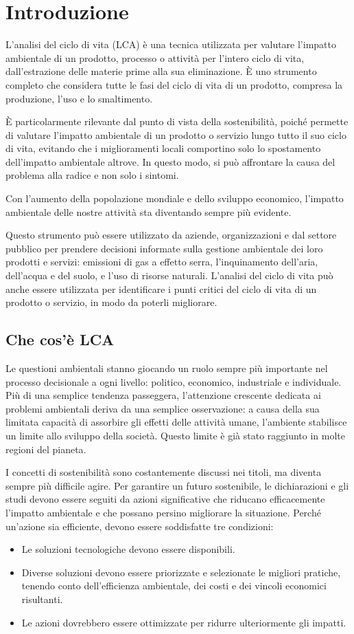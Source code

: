 \section{Introduzione}
L'analisi del ciclo di vita (LCA) è una tecnica utilizzata per valutare l'impatto ambientale di un prodotto, processo o attività per l'intero ciclo di vita, dall'estrazione delle materie prime alla sua eliminazione. È uno strumento completo che considera tutte le fasi del ciclo di vita di un prodotto, compresa la produzione, l'uso e lo smaltimento.

È particolarmente rilevante dal punto di vista della sostenibilità, poiché permette di valutare l'impatto ambientale di un prodotto o servizio lungo tutto il suo ciclo di vita, evitando che i miglioramenti locali comportino solo lo spostamento dell'impatto ambientale altrove. In questo modo, si può affrontare la causa del problema alla radice e non solo i sintomi.

Con l'aumento della popolazione mondiale e dello sviluppo economico, l'impatto ambientale delle nostre attività sta diventando sempre più evidente.

Questo strumento può essere utilizzato da aziende, organizzazioni e dal settore pubblico per prendere decisioni informate sulla gestione ambientale dei loro prodotti e servizi: emissioni di gas a effetto serra, l'inquinamento dell'aria, dell'acqua e del suolo, e l'uso di risorse naturali. L'analisi del ciclo di vita può anche essere utilizzata per identificare i punti critici del ciclo di vita di un prodotto o servizio, in modo da poterli migliorare.
\subsection{Che cos'è LCA}
Le questioni ambientali stanno giocando un ruolo sempre più importante nel processo decisionale a ogni livello: politico, economico, industriale e individuale. Più di una semplice tendenza passeggera, l'attenzione crescente dedicata ai problemi ambientali deriva da una semplice osservazione: a causa della sua limitata capacità di assorbire gli effetti delle attività umane, l'ambiente stabilisce un limite allo sviluppo della società. Questo limite è già stato raggiunto in molte regioni del pianeta\cite{jolliet2015environmental}.

I concetti di sostenibilità sono costantemente discussi nei titoli, ma diventa sempre più difficile agire. Per garantire un futuro sostenibile, le dichiarazioni e gli studi devono essere seguiti da azioni significative che riducano efficacemente l'impatto ambientale e che possano persino migliorare la situazione. Perché un'azione sia efficiente, devono essere soddisfatte tre condizioni:
\begin{itemize}
    \item Le soluzioni tecnologiche devono essere disponibili.
    \item Diverse soluzioni devono essere priorizzate e selezionate le migliori pratiche, tenendo conto dell'efficienza ambientale, dei costi e dei vincoli economici risultanti.
    \item Le azioni dovrebbero essere ottimizzate per ridurre ulteriormente gli impatti.
\end{itemize}

